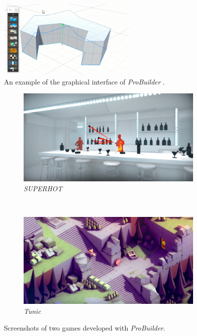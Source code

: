 \begin{figure}[H]
    \centering
    \includegraphics[width = 0.6\textwidth]{Planning report/images/probuilder-example.png}
    \caption{An example of the graphical interface of \textit{ProBuilder} \cite{unity-probuilder-procore}.}
    \label{fig:probuilder-editor}
\end{figure}

\begin{figure}[H]
\centering
\begin{subfigure}{.48\linewidth}
  \centering
  \includegraphics[width=1\linewidth]{Planning report/images/superhot-game.png}
  \caption{\textit{SUPERHOT}}
  \label{fig:superhot-game}
\end{subfigure}
~
\begin{subfigure}{.48\linewidth}
 \centering
  \includegraphics[width=1\linewidth]{Planning report/images/tunic-game.png}
  \caption{\textit{Tunic}}
  \label{fig:tunic-game}
\end{subfigure}
\caption{Screenshots of two games developed with \textit{ProBuilder}.}
\label{fig:probuilder-games}
\end{figure}

